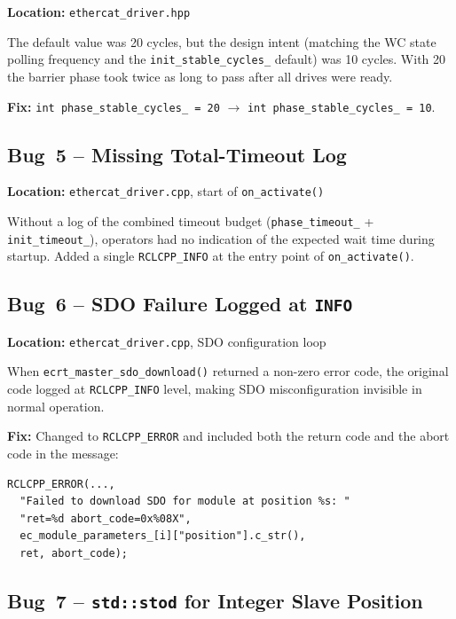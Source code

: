 \documentclass[11pt,a4paper]{article}
\begin{document}
\textbf{Location:} \texttt{ethercat\_driver.hpp}

The default value was 20 cycles, but the design intent (matching the WC
state polling frequency and the \texttt{init\_stable\_cycles\_} default)
was 10 cycles.  With 20 the barrier phase took twice as long to pass after
all drives were ready.

\textbf{Fix:} \texttt{int phase\_stable\_cycles\_ = 20}
$\to$ \texttt{int phase\_stable\_cycles\_ = 10}.

\subsection{Bug~5 -- Missing Total-Timeout Log}
\label{sec:bug5}

\textbf{Location:} \texttt{ethercat\_driver.cpp}, start of \texttt{on\_activate()}

Without a log of the combined timeout budget (\texttt{phase\_timeout\_} +
\texttt{init\_timeout\_}), operators had no indication of the expected wait
time during startup.  Added a single \texttt{RCLCPP\_INFO} at the entry
point of \texttt{on\_activate()}.

\subsection{Bug~6 -- SDO Failure Logged at \texttt{INFO}}
\label{sec:bug6}

\textbf{Location:} \texttt{ethercat\_driver.cpp}, SDO configuration loop

When \texttt{ecrt\_master\_sdo\_download()} returned a non-zero error code,
the original code logged at \texttt{RCLCPP\_INFO} level, making SDO
misconfiguration invisible in normal operation.

\textbf{Fix:} Changed to \texttt{RCLCPP\_ERROR} and included both the
return code and the abort code in the message:

\begin{lstlisting}[caption={Bug~6: SDO error logging}]
RCLCPP_ERROR(...,
  "Failed to download SDO for module at position %s: "
  "ret=%d abort_code=0x%08X",
  ec_module_parameters_[i]["position"].c_str(),
  ret, abort_code);
\end{lstlisting}

\subsection{Bug~7 -- \texttt{std::stod} for Integer Slave Position}
\label{sec:bug7}
\end{document}
